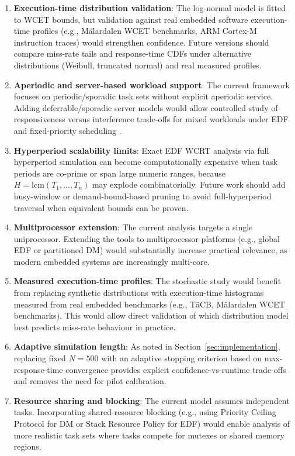 \documentclass[12pt,a4paper]{article}
\begin{document}
\begin{enumerate}
    \item \textbf{Execution-time distribution validation}: The log-normal model is fitted to WCET bounds, but validation against real embedded software execution-time profiles (e.g., Mälardalen WCET benchmarks, ARM Cortex-M instruction traces) would strengthen confidence. Future versions should compare miss-rate tails and response-time CDFs under alternative distributions (Weibull, truncated normal) and real measured profiles.

    \item \textbf{Aperiodic and server-based workload support}: The current framework focuses on periodic/sporadic task sets without explicit aperiodic service. Adding deferrable/sporadic server models would allow controlled study of responsiveness versus interference trade-offs for mixed workloads under EDF and fixed-priority scheduling \cite{spuri1996}.

    \item \textbf{Hyperperiod scalability limits}: Exact EDF WCRT analysis via full hyperperiod simulation can become computationally expensive when task periods are co-prime or span large numeric ranges, because \(H=\mathrm{lcm}(T_1,\dots,T_n)\) may explode combinatorially. Future work should add busy-window or demand-bound-based pruning to avoid full-hyperperiod traversal when equivalent bounds can be proven.

    \item \textbf{Multiprocessor extension}: The current analysis targets a single uniprocessor. Extending the tools to multiprocessor platforms (e.g., global EDF or partitioned DM) would substantially increase practical relevance, as modern embedded systems are increasingly multi-core.

    \item \textbf{Measured execution-time profiles}: The stochastic study would benefit from replacing synthetic distributions with execution-time histograms measured from real embedded benchmarks (e.g., T{\"a}CB, M{\"a}lardalen WCET benchmarks). This would allow direct validation of which distribution model best predicts miss-rate behaviour in practice.

    \item \textbf{Adaptive simulation length}: As noted in Section~\ref{sec:implementation}, replacing fixed \(N = 500\) with an adaptive stopping criterion based on max-response-time convergence provides explicit confidence-vs-runtime trade-offs and removes the need for pilot calibration.

    \item \textbf{Resource sharing and blocking}: The current model assumes independent tasks. Incorporating shared-resource blocking (e.g., using Priority Ceiling Protocol for DM or Stack Resource Policy for EDF) would enable analysis of more realistic task sets where tasks compete for mutexes or shared memory regions.
\end{enumerate}
\end{document}
